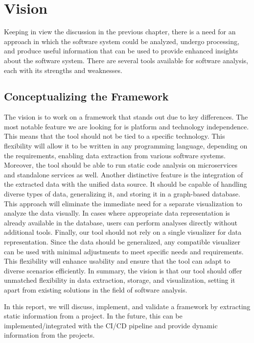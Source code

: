 \section{Vision}\label{sec:vision}

Keeping in view the discussion in the previous chapter, there is a need for an approach in which the software system could be analyzed, undergo processing, and produce useful information that can be used to provide enhanced insights about the software system. There are several tools available for software analysis, each with its strengths and weaknesses. 

\subsection{Conceptualizing the Framework}
The vision is to work on a framework that stands out due to key differences. The most notable feature we are looking for is platform and technology independence. This means that the tool should not be tied to a specific technology. This flexibility will allow it to be written in any programming language, depending on the requirements, enabling data extraction from various software systems. Moreover, the tool should be able to run static code analysis on microservices and standalone services as well. Another distinctive feature is the integration of the extracted data with the unified data source. It should be capable of handling diverse types of data, generalizing it, and storing it in a graph-based database. This approach will eliminate the immediate need for a separate visualization to analyze the data visually. In cases where appropriate data representation is already available in the database, users can perform analyses directly without additional tools. Finally, our tool should not rely on a single visualizer for data representation. Since the data should be generalized, any compatible visualizer can be used with minimal adjustments to meet specific needs and requirements. This flexibility will enhance usability and ensure that the tool can adapt to diverse scenarios efficiently. In summary, the vision is that our tool should offer unmatched flexibility in data extraction, storage, and visualization, setting it apart from existing solutions in the field of software analysis.

In this report, we will discuss, implement, and validate a framework by extracting static information from a project. In the future, this can be implemented/integrated with the CI/CD pipeline and provide dynamic information from the projects.

